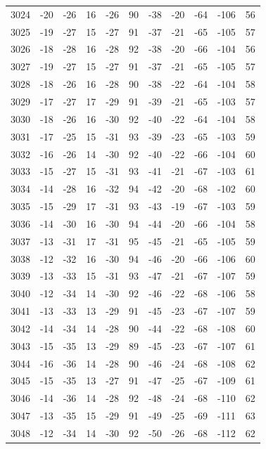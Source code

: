 \begin{table}[H]
\begin{tabular}{lllllllllll}
3024 & -20 & -26 & 16 & -26 & 90 & -38 & -20 & -64 & -106 & 56 \\
3025 & -19 & -27 & 15 & -27 & 91 & -37 & -21 & -65 & -105 & 57 \\
3026 & -18 & -28 & 16 & -28 & 92 & -38 & -20 & -66 & -104 & 56 \\
3027 & -19 & -27 & 15 & -27 & 91 & -37 & -21 & -65 & -105 & 57 \\
3028 & -18 & -26 & 16 & -28 & 90 & -38 & -22 & -64 & -104 & 58 \\
3029 & -17 & -27 & 17 & -29 & 91 & -39 & -21 & -65 & -103 & 57 \\
3030 & -18 & -26 & 16 & -30 & 92 & -40 & -22 & -64 & -104 & 58 \\
3031 & -17 & -25 & 15 & -31 & 93 & -39 & -23 & -65 & -103 & 59 \\
3032 & -16 & -26 & 14 & -30 & 92 & -40 & -22 & -66 & -104 & 60 \\
3033 & -15 & -27 & 15 & -31 & 93 & -41 & -21 & -67 & -103 & 61 \\
3034 & -14 & -28 & 16 & -32 & 94 & -42 & -20 & -68 & -102 & 60 \\
3035 & -15 & -29 & 17 & -31 & 93 & -43 & -19 & -67 & -103 & 59 \\
3036 & -14 & -30 & 16 & -30 & 94 & -44 & -20 & -66 & -104 & 58 \\
3037 & -13 & -31 & 17 & -31 & 95 & -45 & -21 & -65 & -105 & 59 \\
3038 & -12 & -32 & 16 & -30 & 94 & -46 & -20 & -66 & -106 & 60 \\
3039 & -13 & -33 & 15 & -31 & 93 & -47 & -21 & -67 & -107 & 59 \\
3040 & -12 & -34 & 14 & -30 & 92 & -46 & -22 & -68 & -106 & 58 \\
3041 & -13 & -33 & 13 & -29 & 91 & -45 & -23 & -67 & -107 & 59 \\
3042 & -14 & -34 & 14 & -28 & 90 & -44 & -22 & -68 & -108 & 60 \\
3043 & -15 & -35 & 13 & -29 & 89 & -45 & -23 & -67 & -107 & 61 \\
3044 & -16 & -36 & 14 & -28 & 90 & -46 & -24 & -68 & -108 & 62 \\
3045 & -15 & -35 & 13 & -27 & 91 & -47 & -25 & -67 & -109 & 61 \\
3046 & -14 & -36 & 14 & -28 & 92 & -48 & -24 & -68 & -110 & 62 \\
3047 & -13 & -35 & 15 & -29 & 91 & -49 & -25 & -69 & -111 & 63 \\
3048 & -12 & -34 & 14 & -30 & 92 & -50 & -26 & -68 & -112 & 62 \\

\end{tabular}
\end{table}
